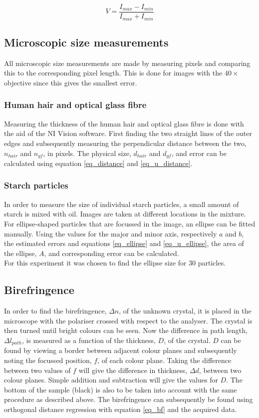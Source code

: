 \begin{equation}
  V = \frac{I_{max}-I_{min}}{I_{max}+I_{min}}
  \label{eq:visibility}
\end{equation}
\subsection{Microscopic size measurements}
All microscopic size measurements are made by measuring pixels and comparing this to the corresponding pixel length. This is done for images with the $40\times$ objective since this gives the smallest error.

\subsubsection*{Human hair and optical glass fibre}
Measuring the thickness of the human hair and optical glass fibre is done with the aid of the NI Vision software. First finding the two straight lines of the outer edges and subsequently measuring the perpendicular distance between the two, $n_{hair}$ and $n_{gf}$, in pixels. The physical size, $d_{hair}$ and $d_{gf}$, and error can be calculated using equation \ref{eq_distance} and \ref{eq_u_distance}.


\subsubsection*{Starch particles}
In order to measure the size of individual starch particles, a small amount of starch is mixed with oil. Images are taken at different locations in the mixture. For ellipse-shaped particles that are focussed in the image, an ellipse can be fitted manually. Using the values for the major and minor axis, respectively $a$ and $b$, the estimated errors and equations \ref{eq_ellipse} and \ref{eq_u_ellipse}, the area of the ellipse, $A$, and corresponding error can be calculated.\\

For this experiment it was chosen to find the ellipse size for 30 particles.


\subsection{Birefringence}
In order to find the birefringence, $\Delta n$, of the unknown crystal, it is placed in the microscope with the polariser crossed with respect to the analyser. The crystal is then turned until bright colours can be seen. Now the difference in path length, $\Delta l_{path}$, is measured as a function of the thickness, $D$, of the crystal. $D$ can be found by viewing a border between adjacent colour planes and subsequently noting the focussed position, $f$, of each colour plane. Taking the difference between two values of $f$ will give the difference in thickness, $\Delta d$, between two colour planes. Simple addition and subtraction will give the values for $D$. The bottom of the sample (black) is also to be taken into account with the same procedure as described above. The birefringence can subsequently be found using orthogonal distance regression with equation \ref{eq_bf} and the acquired data.\\

